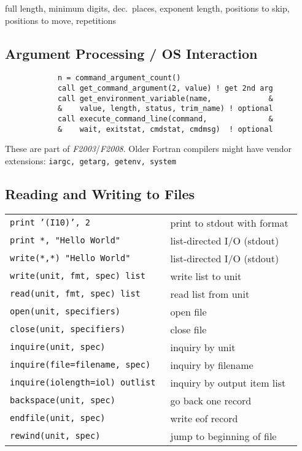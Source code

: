 \documentclass[8pt]{extarticle} %
\begin{document}
\begin{multicols}{3}
		\vspace{1ex}
		 full length,
		 minimum digits,
		 dec.\ places,
		 exponent length,
		 positions to skip,
		 positions to move,
		 repetitions
		
		\vspace{1ex}
		\subsection{Argument Processing / OS Interaction}
		\begin{verbatim}
			n = command_argument_count()
			call get_command_argument(2, value) ! get 2nd arg
			call get_environment_variable(name,             &
			&    value, length, status, trim_name) ! optional
			call execute_command_line(command,              &
			&    wait, exitstat, cmdstat, cmdmsg)  ! optional
		\end{verbatim}
		
		\vspace{-2ex}
		These are part of \textit{F2003}/\textit{F2008}. Older Fortran compilers might
		have vendor extensions: {\tt iargc, getarg, getenv, system}
		
		\subsection{Reading and Writing to Files}
		\begin{tabular}{L{0.55\linewidth} L{0.45\linewidth}}
			\tt print~'(I10)',~2                            & print to stdout with format \\
			\tt print~*,~"Hello~World"                      & list-directed I/O (stdout)\\
			\tt write(*,*)~"Hello~World"                    & list-directed I/O (stdout)\\
			\tt write(unit,~fmt,~spec)~list                 & write list to unit \\
			\tt read(unit,~fmt,~spec)~list                  & read list from unit \\
			\tt open(unit,~specifiers)                      & open file \\
			\tt close(unit,~specifiers)                     & close file \\
			\tt inquire(unit,~spec)                         & inquiry by unit \\
			\tt inquire(file=filename,~spec)                & inquiry by filename \\
			\tt inquire(iolength=iol)~outlist               & inquiry by output item list \\
			\tt backspace(unit,~spec)                       & go back one record \\
			\tt endfile(unit,~spec)                         & write eof record \\
			\tt rewind(unit,~spec)                          & jump to beginning of file
		\end{tabular}
		

\end{multicols}
\end{document}
